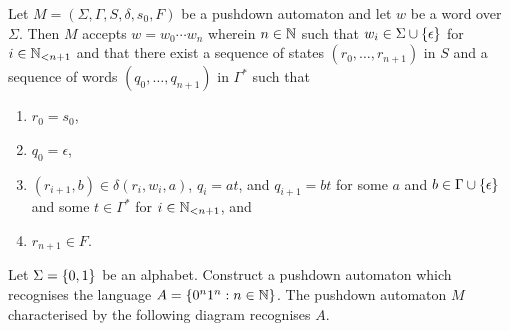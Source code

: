 Let \(M = (\Sigma, \Gamma, S, \delta, s_0, F)\) be a pushdown automaton and let
\(w\) be a word over \(\Sigma\). Then \(M\) accepts \(w = w_0 \cdots w_n\)
wherein \(n \in \setnat\) such that \(w_i \in \Sigma \cup \set{\epsilon}\) for
\(i \in \Nln[n + 1]\) and that there exist a sequence of states \((r_0, \ldots,
r_{n + 1})\) in \(S\) and a sequence of words \((q_0, \ldots, q_{n + 1})\) in
\(\Gamma^*\) such that
\begin{enumerate}
    \item \(r_0 = s_0\),
    \item \(q_0 = \epsilon\),
    \item \((r_{i + 1}, b) \in \delta(r_i, w_i, a)\), \(q_i = a t\), and \(q_{i
    + 1} = b t\) for some \(a\) and \(b \in \Gamma \cup \set{\epsilon}\) and
    some \(t \in \Gamma^*\) for \(i \in \Nln[n + 1]\), and
    \item \(r_{n + 1} \in F\).
\end{enumerate}

\Bxr
    Let \(\Sigma = \set{0, 1}\) be an alphabet. Construct a pushdown automaton
    which recognises the language \(A = \set{0^n 1^n : n \in \setnat}\).
\Exr
\Bsl
    The pushdown automaton \(M\) characterised by the following diagram
    recognises \(A\).
    \begin{figure}[!h]
        \centering
    \end{figure}

